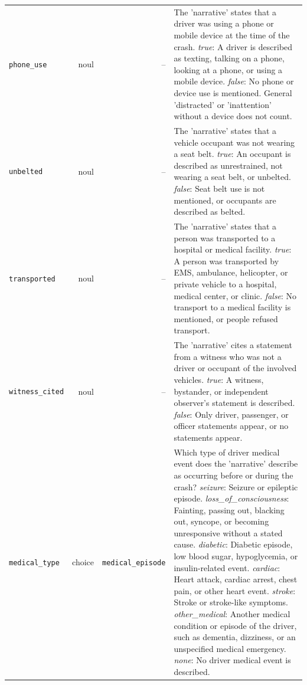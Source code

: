 \begin{small}
\begin{longtable}{lrr>{\raggedright\arraybackslash}p{267.2pt}}
\texttt{phone\_use} & noul & -- & The 'narrative' states that a driver was using a phone or mobile device at the time of the crash. \newline \textit{true}: A driver is described as texting, talking on a phone, looking at a phone, or using a mobile device. \newline \textit{false}: No phone or device use is mentioned. General 'distracted' or 'inattention' without a device does not count. \\
\texttt{unbelted} & noul & -- & The 'narrative' states that a vehicle occupant was not wearing a seat belt. \newline \textit{true}: An occupant is described as unrestrained, not wearing a seat belt, or unbelted. \newline \textit{false}: Seat belt use is not mentioned, or occupants are described as belted. \\
\texttt{transported} & noul & -- & The 'narrative' states that a person was transported to a hospital or medical facility. \newline \textit{true}: A person was transported by EMS, ambulance, helicopter, or private vehicle to a hospital, medical center, or clinic. \newline \textit{false}: No transport to a medical facility is mentioned, or people refused transport. \\
\texttt{witness\_cited} & noul & -- & The 'narrative' cites a statement from a witness who was not a driver or occupant of the involved vehicles. \newline \textit{true}: A witness, bystander, or independent observer's statement is described. \newline \textit{false}: Only driver, passenger, or officer statements appear, or no statements appear. \\
\texttt{medical\_type} & choice & \texttt{medical\_episode} & Which type of driver medical event does the 'narrative' describe as occurring before or during the crash? \newline \textit{seizure}: Seizure or epileptic episode. \newline \textit{loss\_of\_consciousness}: Fainting, passing out, blacking out, syncope, or becoming unresponsive without a stated cause. \newline \textit{diabetic}: Diabetic episode, low blood sugar, hypoglycemia, or insulin-related event. \newline \textit{cardiac}: Heart attack, cardiac arrest, chest pain, or other heart event. \newline \textit{stroke}: Stroke or stroke-like symptoms. \newline \textit{other\_medical}: Another medical condition or episode of the driver, such as dementia, dizziness, or an unspecified medical emergency. \newline \textit{none}: No driver medical event is described. \\

\end{longtable}
\end{small}
